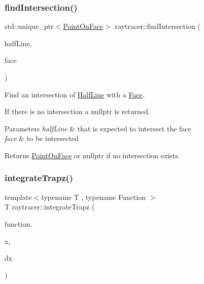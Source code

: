 \subsubsection{\texorpdfstring{find\+Intersection()}{findIntersection()}}
{\footnotesize\ttfamily std\+::unique\+\_\+ptr$<$\hyperlink{structraytracer_1_1PointOnFace}{Point\+On\+Face}$>$ raytracer\+::find\+Intersection (\begin{DoxyParamCaption}\item[{const \hyperlink{structraytracer_1_1HalfLine}{Half\+Line} \&}]{half\+Line,  }\item[{const \hyperlink{classraytracer_1_1Face}{Face} $\ast$}]{face }\end{DoxyParamCaption})}



Find an intersection of \hyperlink{structraytracer_1_1HalfLine}{Half\+Line} with a \hyperlink{classraytracer_1_1Face}{Face}. 

If there is no intersection a nullptr is returned. 
\begin{DoxyParams}{Parameters}
{\em half\+Line} & that is expected to intersect the face \\
\hline
{\em face} & to be intersected \\
\hline
\end{DoxyParams}
\begin{DoxyReturn}{Returns}
\hyperlink{structraytracer_1_1PointOnFace}{Point\+On\+Face} or nullptr if no intersection exists. 
\end{DoxyReturn}
\mbox{\label{namespaceraytracer_a475981755b95ba13b5ac34bf32754659}} 
\subsubsection{\texorpdfstring{integrate\+Trapz()}{integrateTrapz()}}
{\footnotesize\ttfamily template$<$typename T , typename Function $>$ \\
T raytracer\+::integrate\+Trapz (\begin{DoxyParamCaption}\item[{Function}]{function,  }\item[{T}]{x,  }\item[{T}]{dx }\end{DoxyParamCaption})}



